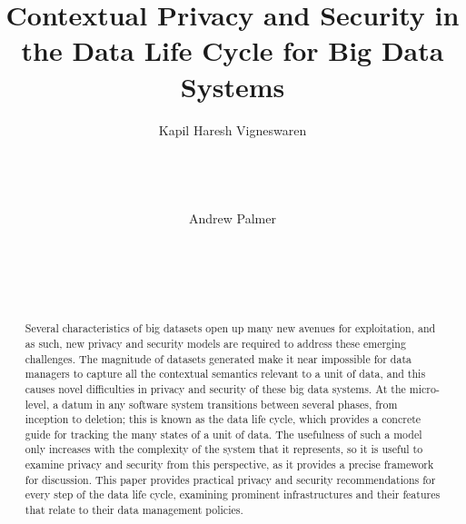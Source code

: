 \documentclass{sigchi}
\begin{document}
\title{Contextual Privacy and Security in the Data Life Cycle for Big Data Systems}

\author{
  \alignauthor Kapil Haresh Vigneswaren\\
    \\
    \\
    \\
    \\
  \alignauthor Andrew Palmer\\
    \\
    \\
    \\
    \\
}


\maketitle

\begin{abstract}
Several characteristics of big datasets open up many new avenues for exploitation, and as such, new privacy and security models are required to address these emerging challenges. The magnitude of datasets generated make it near impossible for data managers to capture all the contextual semantics relevant to a unit of data, and this causes novel difficulties in privacy and security of these big data systems. At the micro-level, a datum in any software system transitions between several phases, from inception to deletion; this is known as the data life cycle, which provides a concrete guide for tracking the many states of a unit of data. The usefulness of such a model only increases with the complexity of the system that it represents, so it is useful to examine privacy and security from this perspective, as it provides a precise framework for discussion. This paper provides practical privacy and security recommendations for every step of the data life cycle, examining prominent infrastructures and their features that relate to their data management policies.
\end{abstract}
\end{document}
